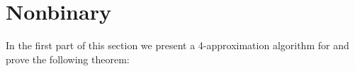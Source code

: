 %
%
%
%
%
%
%


\section{Nonbinary \maf}
\label{sec:nbmaf}

In the first part of this section we present a 4-approximation algorithm for \maf and prove the following theorem:

